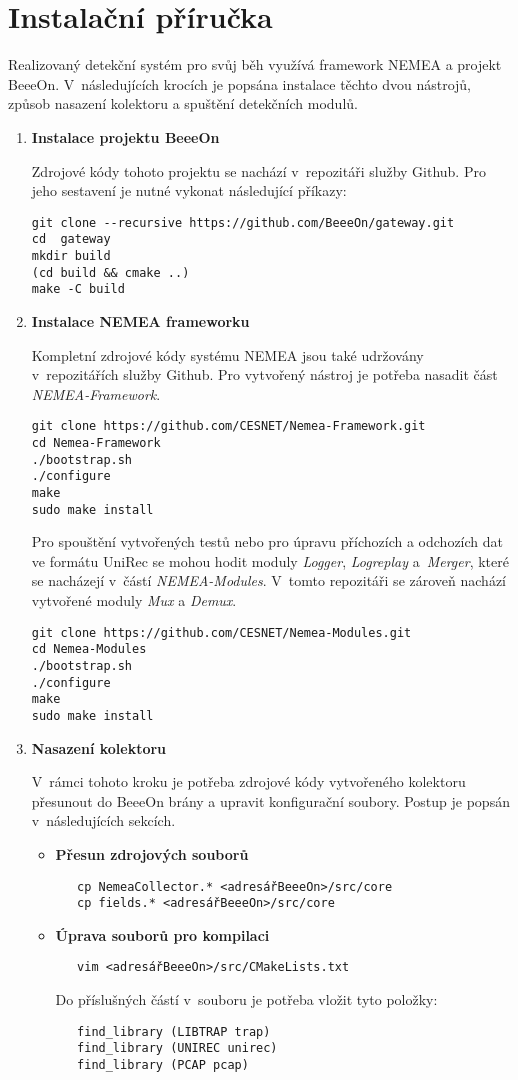\documentclass[thesis=M,czech]{FITthesis}[2012/06/26]
\begin{document}
\chapter{Instalační příručka}
Realizovaný detekční systém pro svůj běh využívá framework NEMEA a projekt BeeeOn. V~následujících
krocích je popsána instalace těchto dvou nástrojů, způsob nasazení kolektoru a
spuštění detekčních modulů.

\begin{enumerate}
 \item \textbf{Instalace projektu BeeeOn}
 
 Zdrojové kódy tohoto projektu se nachází v~repozitáři služby Github. Pro jeho sestavení je nutné
 vykonat následující příkazy: 
\begin{verbatim}
git clone --recursive https://github.com/BeeeOn/gateway.git
cd  gateway
mkdir build
(cd build && cmake ..)
make -C build
\end{verbatim}
 \item \textbf{Instalace NEMEA frameworku}
 
Kompletní zdrojové kódy systému NEMEA jsou také udržovány v~repozitářích služby Github. Pro
vytvořený nástroj je potřeba nasadit část \textit{NEMEA-Framework}.
\begin{verbatim}
git clone https://github.com/CESNET/Nemea-Framework.git
cd Nemea-Framework
./bootstrap.sh
./configure
make
sudo make install
\end{verbatim}

Pro spouštění vytvořených testů nebo pro úpravu příchozích a odchozích dat ve formátu UniRec se
mohou hodit moduly \textit{Logger}, \textit{Logreplay} a~\textit{Merger}, které se nacházejí
v~částí \textit{NEMEA-Modules}. V~tomto 
repozitáři se zároveň nachází vytvořené moduly \textit{Mux} a \textit{Demux}.
\begin{verbatim}
git clone https://github.com/CESNET/Nemea-Modules.git
cd Nemea-Modules
./bootstrap.sh
./configure
make
sudo make install
\end{verbatim}

\item \textbf{Nasazení kolektoru}

V~rámci tohoto kroku je potřeba zdrojové kódy vytvořeného kolektoru přesunout do BeeeOn brány
a upravit konfigurační soubory. Postup je popsán v~následujících sekcích.
\begin{itemize}
 \item \textbf{Přesun zdrojových souborů}
\begin{verbatim}
   cp NemeaCollector.* <adresářBeeeOn>/src/core
   cp fields.* <adresářBeeeOn>/src/core
\end{verbatim}
\item \textbf{Úprava souborů pro kompilaci}
\begin{verbatim}
   vim <adresářBeeeOn>/src/CMakeLists.txt
\end{verbatim}
Do příslušných částí v~souboru je potřeba vložit tyto položky: 
\begin{verbatim}
   find_library (LIBTRAP trap)
   find_library (UNIREC unirec)
   find_library (PCAP pcap)


\end{verbatim}
\end{itemize}
\end{enumerate}
\end{document}

